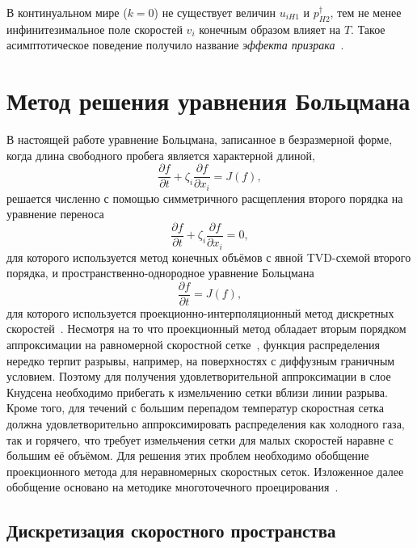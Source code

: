\documentclass[
aps,%
12pt,%
final,%
notitlepage,%
oneside,%
onecolumn,%
nobibnotes,%
nofootinbib,%
superscriptaddress,%
noshowpacs,%
showkeys,%
floatfix,%
tightenlines,%
centertags]%
{revtex4}
\newcommand{\pder}[2][]{\frac{\partial#1}{\partial#2}}
\begin{document}
В континуальном мире (\(k=0\)) не существует величин \(u_{iH1}\) и \(p^\dag_{H2}\),
тем не менее инфинитезимальное поле скоростей \(v_i\) конечным образом влияет на \(T\).
Такое асимптотическое поведение получило название \emph{эффекта призрака}~\cite{Sone2002, Sone2007}.

\section{Метод решения уравнения Больцмана}

В настоящей работе уравнение Больцмана, записанное в безразмерной форме,
когда длина свободного пробега является характерной длиной,
\begin{equation}\label{eq:Boltzmann_equation2}
    \pder[f]{t} + \zeta_i\pder[f]{x_i} = J(f),
\end{equation}
решается численно с помощью симметричного расщепления второго порядка на уравнение переноса
\begin{equation}\label{eq:split_transport}
    \pder[f]{t} + \zeta_i\pder[f]{x_i} = 0,
\end{equation}
для которого используется метод конечных объёмов с явной TVD-схемой второго порядка,
и пространственно-однородное уравнение Больцмана
\begin{equation}\label{eq:split_collisions}
    \pder[f]{t} = J(f),
\end{equation}
для которого используется проекционно-интерполяционный
метод дискретных скоростей~\cite{Tcheremissine1997, Tcheremissine2006, Dodulad2015}.
Несмотря на то что проекционный метод обладает вторым порядком аппроксимации
на равномерной скоростной сетке~\cite{Anikin2012},
функция распределения нередко терпит разрывы, например, на поверхностях с диффузным граничным условием.
Поэтому для получения удовлетворительной аппроксимации в слое Кнудсена необходимо прибегать
к измельчению сетки вблизи линии разрыва.
Кроме того, для течений с большим перепадом температур скоростная сетка должна удовлетворительно аппроксимировать
распределения как холодного газа, так и горячего, что требует измельчения сетки для малых скоростей
наравне с большим её объёмом.
Для решения этих проблем необходимо обобщение проекционного метода для неравномерных скоростных сеток.
Изложенное далее обобщение основано на методике многоточечного проецирования~\citep{Dodulad2012}.

\subsection{Дискретизация скоростного пространства}
\end{document}
